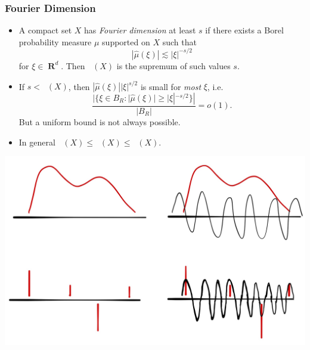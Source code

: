 \documentclass[usenames,dvipsnames,handout]{beamer}
\DeclareMathOperator{\RR}{\textbf{R}}
\DeclareMathOperator{\ZZ}{\textbf{Z}}
\DeclareMathOperator{\fordim}{\text{dim}_{\textbf{F}}}
\DeclareMathOperator{\hausdim}{\text{dim}_{\textbf{H}}}
\DeclareMathOperator{\minkdim}{\text{dim}_{\textbf{M}}}
\begin{document}
\begin{frame}
    \frametitle{Fourier Dimension}

\begin{itemize}
    \item<3-> A compact set $X$ has \emph{Fourier dimension} at least $s$ if there exists a Borel probability measure $\mu$ supported on $X$ such that
    \[ |\widehat{\mu}(\xi)| \lesssim |\xi|^{-s/2} \]
    for $\xi \in \RR^d$. Then $\fordim(X)$ is the supremum of such values $s$.


    \item If $s < \hausdim(X)$, then $|\widehat{\mu}(\xi)| |\xi|^{s/2}$ is small for \emph{most} $\xi$, i.e.
    \[ \frac{| \{ \xi \in B_R: |\widehat{\mu}(\xi)| \geq |\xi|^{-s/2} \}|}{|B_R|} = o(1). \]
    But a uniform bound is not always possible.

    \item In general $\fordim(X) \leq \hausdim(X) \leq \minkdim(X)$.


\end{itemize}


\end{frame}

\begin{frame}
    \includegraphics[width=\textwidth]{../Images/FourierDimension}
\end{frame}
\end{document}
